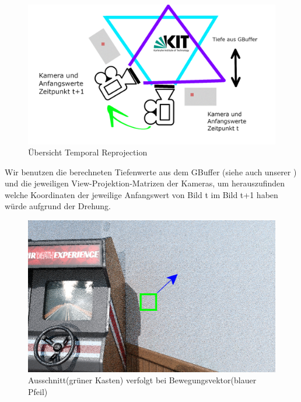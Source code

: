 \begin{figure}[H]
        \centering
        \includegraphics[width=\linewidth]{content/TemporalerAlg/Bilder/Reprojection/TemporalReprojectPrincipal.png}
        \caption{Übersicht Temporal Reprojection}
        \label{pic:Uebersicht_Temporal_Reprojection}
\end{figure}

Wir benutzen die berechneten Tiefenwerte aus dem GBuffer (siehe auch unserer ) und die jeweiligen 
View-Projektion-Matrizen der Kameras, um herauszufinden welche Koordinaten der jeweilige Anfangswert von Bild t im Bild t+1 
haben würde aufgrund der Drehung.
\par 

\newpage

  \begin{figure}[H]
    \begin{tcolorbox}
    \centering
    \includegraphics[width=0.6\linewidth]{content/TemporalerAlg/Bilder/Reprojection/Szene_bearbeitet.png}
    \end{tcolorbox}
    \caption{Ausschnitt(grüner Kasten) verfolgt bei Bewegungsvektor(blauer Pfeil)}
    \label{pic:TemporalReprComparison}
  \end{figure}


